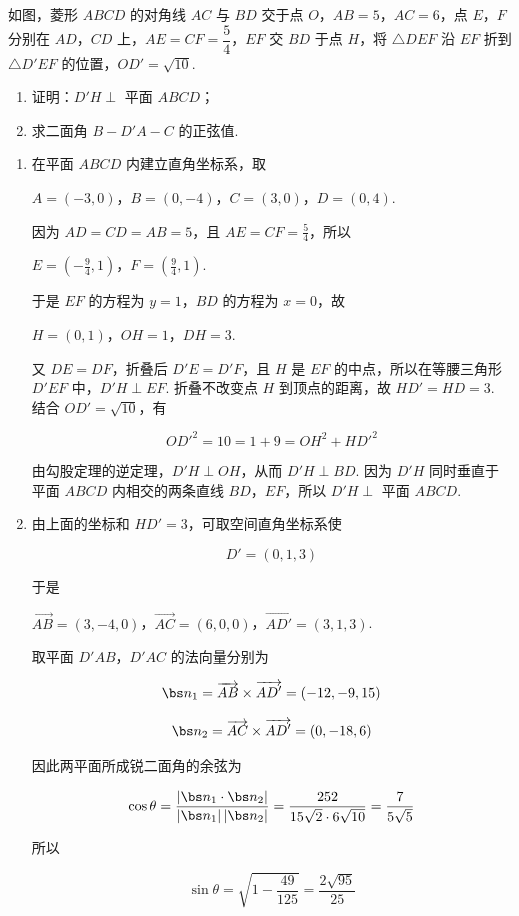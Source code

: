 \begin{problem}
如图，菱形 \(ABCD\) 的对角线 \(AC\) 与 \(BD\) 交于点 \(O\)，\(AB=5\)，\(AC=6\)，点 \(E\)，\(F\) 分别在 \(AD\)，\(CD\) 上，\(AE=CF=\dfrac54\)，\(EF\) 交 \(BD\) 于点 \(H\)，将 \(\triangle DEF\) 沿 \(EF\) 折到 \(\triangle D'EF\) 的位置，\(OD'=\sqrt{10}\).
\begin{enumerate}
\item 证明：\(D'H\perp\) 平面 \(ABCD\)；
\item 求二面角 \(B-D'A-C\) 的正弦值.
\end{enumerate}

\begingroup
{}
\endgroup
\end{problem}

\begin{solution}
\begin{enumerate}
\item 在平面 \(ABCD\) 内建立直角坐标系，取

\(A=(-3,0)\)，\(B=(0,-4)\)，\(C=(3,0)\)，\(D=(0,4)\).

因为 \(AD=CD=AB=5\)，且 \(AE=CF=\frac{5}{4}\)，所以

\(E=\left(-\frac94,1\right)\)，\(F=\left(\frac94,1\right)\).

于是 \(EF\) 的方程为 \(y=1\)，\(BD\) 的方程为 \(x=0\)，故

\(H=(0,1)\)，\(OH=1\)，\(DH=3\).

又 \(DE=DF\)，折叠后 \(D'E=D'F\)，且 \(H\) 是 \(EF\) 的中点，所以在等腰三角形 \(D'EF\) 中，\(D'H\perp EF\). 折叠不改变点 \(H\) 到顶点的距离，故 \(HD'=HD=3\). 结合 \(OD'=\sqrt{10}\)，有

\[
OD'^2=10=1+9=OH^2+HD'^2
\]

由勾股定理的逆定理，\(D'H\perp OH\)，从而 \(D'H\perp BD\). 因为 \(D'H\) 同时垂直于平面 \(ABCD\) 内相交的两条直线 \(BD\)，\(EF\)，所以 \(D'H\perp\) 平面 \(ABCD\).

\item 由上面的坐标和 \(HD'=3\)，可取空间直角坐标系使

\[
D'=(0,1,3)
\]

于是

\(\overrightarrow{AB}=(3,-4,0)\)，\(\overrightarrow{AC}=(6,0,0)\)，\(\overrightarrow{AD'}=(3,1,3)\).

取平面 \(D'AB\)，\(D'AC\) 的法向量分别为

\[
\bs n_1=\overrightarrow{AB}\times\overrightarrow{AD'}=(-12,-9,15)
\]

\[
\bs n_2=\overrightarrow{AC}\times\overrightarrow{AD'}=(0,-18,6)
\]

因此两平面所成锐二面角的余弦为

\[
\cos\theta=\frac{|\bs n_1\cdot\bs n_2|}{|\bs n_1|\,|\bs n_2|}=\frac{252}{15\sqrt2\cdot6\sqrt{10}}=\frac7{5\sqrt5}
\]

所以

\[
\sin\theta=\sqrt{1-\frac{49}{125}}=\frac{2\sqrt{95}}{25}
\]
\end{enumerate}
\end{solution}


